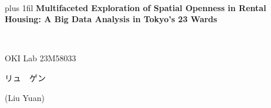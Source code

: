 \documentclass[11pt,a4paper]{article}
\begin{document}
\begin{center}
~\\
{\fontsize{12}{14}\selectfont \spaceskip=0pt plus 1fil \textbf{Multifaceted Exploration of Spatial Openness in Rental Housing: A Big Data Analysis in Tokyo's 23 Wards}}\\

\begin{CJK}{UTF8}{min}
{\fontsize{11}{11}\selectfont {賃貸住宅における空間開放性の多面的探究：東京23区のビッグデータ分析}}
\end{CJK}\\
\end{center}
\begin{flushright}
{\fontsize{11}{13}\selectfont \spaceskip=0pt OKI Lab  23M58033 \begin{CJK}{UTF8}{min}リュ　ゲン\end{CJK} (Liu Yuan)}
\end{flushright}
\end{document}
